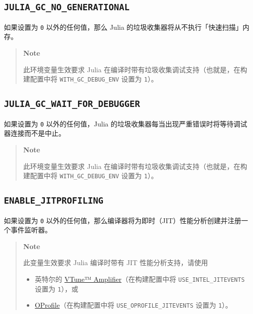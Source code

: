 \hypertarget{15291982466110123243}{}


\subsection{\texttt{JULIA\_GC\_NO\_GENERATIONAL}}



如果设置为 \texttt{0} 以外的任何值，那么 Julia 的垃圾收集器将从不执行「快速扫描」内存。



\begin{quote}
\textbf{Note}

此环境变量生效要求 Julia 在编译时带有垃圾收集调试支持（也就是，在构建配置中将 \texttt{WITH\_GC\_DEBUG\_ENV} 设置为 \texttt{1}）。

\end{quote}


\hypertarget{4439082668862420182}{}


\subsection{\texttt{JULIA\_GC\_WAIT\_FOR\_DEBUGGER}}



如果设置为 \texttt{0} 以外的任何值，Julia 的垃圾收集器每当出现严重错误时将等待调试器连接而不是中止。



\begin{quote}
\textbf{Note}

此环境变量生效要求 Julia 在编译时带有垃圾收集调试支持（也就是，在构建配置中将 \texttt{WITH\_GC\_DEBUG\_ENV} 设置为 \texttt{1}）。

\end{quote}


\hypertarget{1100661411174026998}{}


\subsection{\texttt{ENABLE\_JITPROFILING}}



如果设置为 \texttt{0} 以外的任何值，那么编译器将为即时（JIT）性能分析创建并注册一个事件监听器。



\begin{quote}
\textbf{Note}

此变量生效要求 Julia 编译时带有 JIT 性能分析支持，请使用

\begin{itemize}
\item 英特尔的 \href{https://software.intel.com/en-us/intel-vtune-amplifier-xe}{VTune™ Amplifier}（在构建配置中将 \texttt{USE\_INTEL\_JITEVENTS} 设置为 \texttt{1}），或


\item \href{http://oprofile.sourceforge.net/news/}{OProfile}（在构建配置中将 \texttt{USE\_OPROFILE\_JITEVENTS} 设置为 \texttt{1}）。

\end{itemize}
\end{quote}



